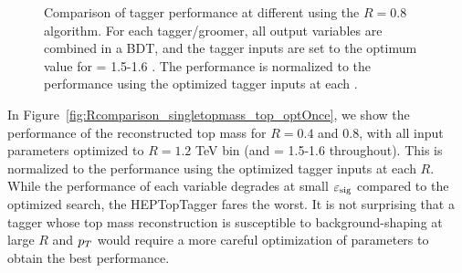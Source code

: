 \begin{figure}
\caption{Comparison of tagger performance at different \pt using the \antikt $R=0.8$ algorithm. For each tagger/groomer, all output variables are combined in a BDT, and the tagger inputs are set to the optimum value for \pt = 1.5-1.6 \TeV. The performance is normalized to the performance using the optimized tagger inputs at each \pt.}
\label{fig:ptcomparison_top_optOnce}
\end{figure}


In Figure~\ref{fig:Rcomparison_singletopmass_top_optOnce}, we show the performance of the reconstructed top mass for $R=0.4$ and 0.8, with all input parameters optimized to $R=1.2$ TeV bin (and \pt = 1.5-1.6 \TeV throughout). This is normalized to the performance using the optimized tagger inputs at each $R$. While the performance of each variable degrades at small $\varepsilon_{\rm sig}$ compared to the optimized search, the HEPTopTagger fares the worst. It is not surprising that a tagger whose top mass reconstruction is susceptible to background-shaping at large $R$ and $p_T$ would require a more careful optimization of parameters to obtain the best performance.

